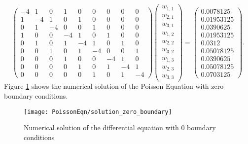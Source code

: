 \[\left(\begin{array}{ccccccccc}
-4& 1 & 0 &1 &0 &0 &0 &0 &0\\
1&-4& 1 & 0 &1 &0 &0 &0 &0 \\
0 &1&-4&  0&0 &1 &0 &0 &0 \\
1 &0 &0 &-4& 1 & 0 &1 &0 &0\\
0 & 1 &0 &1&-4& 1 &0 &1 &0  \\
0 &0 &1 &0 &1&-4&0&  0 &1  \\
0&0&0&1 &0 &0 &-4& 1 & 0\\
0&0&0&0 & 1 &0 &1&-4& 1   \\
0&0&0&0 &0 &1 &0 &1&-4
\end{array}\right)
\left(\begin{array}{c}
w_{1,1}\\
w_{2,1}\\
w_{3,1}\\
w_{1,2}\\
w_{2,2}\\
w_{3,2}\\
w_{1,3}\\
w_{2,3}\\
w_{3,3}
\end{array}\right)=
\left(\begin{array}{c}
0.0078125\\
0.01953125\\
0.0390625 \\
 0.01953125\\
 0.0312\\
0.05078125\\
0.0390625\\
0.05078125\\
0.0703125
\end{array}\right).
\]	
Figure \ref{SolPossZero} shows the numerical solution of the Poisson Equation with zero boundary conditions.
\begin{figure}[H]
  \caption{Numerical solution of the differential equation with 0 boundary conditions }\label{SolPossZero}
  \centering
    \texttt{[image: PoissonEqn/solution\_zero\_boundary]}
\end{figure}

